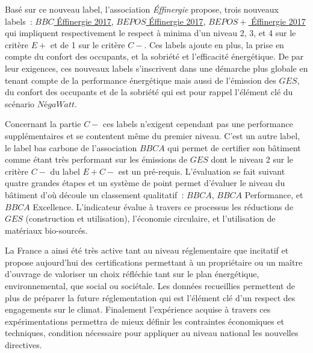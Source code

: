 Basé sur ce nouveau label, l’association \textit{Éffinergie} propose, trois nouveaux labels~:
\href{https://www.effinergie.org/web/index.php/les-labels-effinergie/le-label-bbc-effinergie-2017}{$BBC$ Éffinergie 2017},
\href{https://www.effinergie.org/web/index.php/les-labels-effinergie/le-label-bepos-bepos-effinergie-2017}{$BEPOS$ Éffinergie 2017},
\href{https://www.effinergie.org/web/index.php/les-labels-effinergie/le-label-bepos-bepos-effinergie-2017}{$BEPOS +$ Éffinergie 2017}
qui impliquent respectivement le respect à minima d’un niveau 2, 3, et 4 sur le critère $E+$ et
de 1 sur le critère $C-$. Ces labels ajoute en plus, la prise en compte du confort des occupants, et la sobriété
et l’efficacité énergétique. De par leur exigences, ces nouveaux labels s’inscrivent dans une
démarche plus globale en tenant compte de la performance énergétique mais aussi de l’émission
des $GES$, du confort des occupants et de la sobriété qui est pour rappel l’élément clé
du scénario $NégaWatt$.

Concernant la partie $C-$ ces labels n’exigent cependant pas une performance supplémentaires
et se contentent même du premier niveau. C’est un autre label, le label bas carbone de l’association
\href{http://www.certivea.fr/offres/label-bbca-batiment-bas-carbone}{$BBCA$} qui permet de
certifier son bâtiment comme étant très performant sur les émissions de $GES$
dont le niveau 2 sur le critère $C-$ du label $E+C-$ est un pré-requis. L’évaluation
se fait suivant quatre grandes étapes et un système de point permet d’évaluer le niveau
du bâtiment d’où découle un classement qualitatif~: $BBCA$, $BBCA$ Performance, et $BBCA$ Excellence.
L’indicateur évalue à travers ce processus les réductions de $GES$ (construction et utilisation),
l’économie circulaire, et l’utilisation de matériaux bio-sourcés.

La France a ainsi été très active tant au niveau réglementaire que incitatif et propose
aujourd’hui des certifications permettant à un propriétaire ou un maître d’ouvrage
de valoriser un choix réfléchie tant sur le plan énergétique, environnemental, que
social ou sociétale. Les données recueillies permettent de plus de préparer la future réglementation
qui est l’élément clé d’un respect des engagements sur le climat. Finalement l’expérience
acquise à travers ces expérimentations permettra de mieux définir les contraintes
économiques et techniques, condition nécessaire pour appliquer au niveau national les nouvelles
directives.


